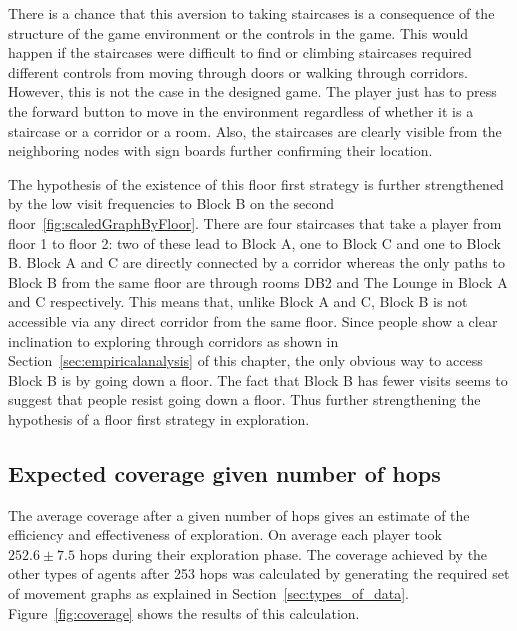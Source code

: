 There is a chance that this aversion to taking staircases is a consequence of the structure of the game environment or the controls in the game. This would happen if the staircases were difficult to find or climbing staircases required different controls from moving through doors or walking through corridors. However, this is not the case in the designed game. The player just has to press the forward button to move in the environment regardless of whether it is a staircase or a corridor or a room. Also, the staircases are clearly visible from the neighboring nodes with sign boards further confirming their location.

The hypothesis of the existence of this floor first strategy is further strengthened by the low visit frequencies to Block B on the second floor~\ref{fig:scaledGraphByFloor}. There are four staircases that take a player from floor 1 to floor 2: two of these lead to Block A, one to Block C and one to Block B. Block A and C are directly connected by a corridor whereas the only paths to Block B from the same floor are through rooms DB2 and The Lounge in Block A and C respectively. This means that, unlike Block A and C, Block B is not accessible via any direct corridor from the same floor. Since people show a clear inclination to exploring through corridors as shown in Section~\ref{sec:empiricalanalysis} of this chapter, the only obvious way to access Block B is by going down a floor. The fact that Block B has fewer visits seems to suggest that people resist going down a floor. Thus further strengthening the hypothesis of a floor first strategy in exploration.


\subsection{Expected coverage given number of hops} %
\label{sec:calculation_4_expected_coverage_given_number_of_hops}

The average coverage after a given number of hops gives an estimate of the efficiency and effectiveness of exploration. On average each player took $252.6 \pm 7.5$ hops during their exploration phase. The coverage achieved by the other types of agents after 253 hops was calculated by generating the required set of movement graphs as explained in Section~\ref{sec:types_of_data}. Figure~\ref{fig:coverage} shows the results of this calculation.


